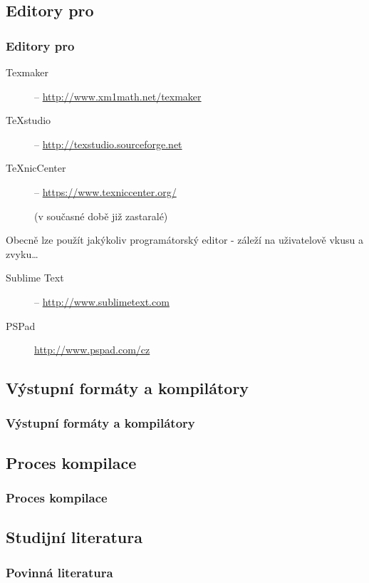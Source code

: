 \subsection{Editory pro }
\begin{frame}
	\frametitle{Editory pro }
	\begin{description}
		\item[Texmaker] -- \url{http://www.xm1math.net/texmaker}
		\item[TeXstudio] -- \url{http://texstudio.sourceforge.net}
		\item[TeXnicCenter] -- \url{https://www.texniccenter.org/}\par{}(v současné době již zastaralé)
	\end{description}
	\par
	Obecně lze použít jakýkoliv programátorský editor - záleží na uživatelově vkusu a zvyku\ldots
	\begin{description}
		\item[Sublime Text] -- \url{http://www.sublimetext.com}
		\item[PSPad]\url{http://www.pspad.com/cz}
	\end{description}
\end{frame}


\subsection{Výstupní formáty a kompilátory}
\begin{frame}
	\frametitle{Výstupní formáty a kompilátory}
	\centering
	\resizebox{\textwidth}{!}{}
\end{frame}


\subsection{Proces kompilace}
\begin{frame}
	\frametitle{Proces kompilace}
	\centering
	
\end{frame}


\subsection{Studijní literatura}
\begin{refsection}
	\nocite{Satrapa2023}
	\begin{frame}[t, allowframebreaks]
		\frametitle{Povinná literatura}
		\printbibliography[heading=none]
	\end{frame}
\end{refsection}


